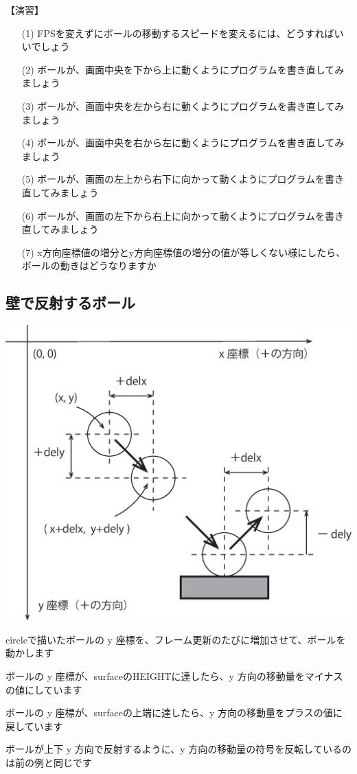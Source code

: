 \documentclass[uplatex,a4paper,11pt,oneside,openany]{jsbook}
\begin{document}
【演習】
\begin{enumerate}
\item[(1)] FPSを変えずにボールの移動するスピードを変えるには、どうすればいいでしょう
\item[(2)] ボールが、画面中央を下から上に動くようにプログラムを書き直してみましょう
\item[(3)] ボールが、画面中央を左から右に動くようにプログラムを書き直してみましょう
\item[(4)] ボールが、画面中央を右から左に動くようにプログラムを書き直してみましょう
\item[(5)] ボールが、画面の左上から右下に向かって動くようにプログラムを書き直してみましょう
\item[(6)] ボールが、画面の左下から右上に向かって動くようにプログラムを書き直してみましょう
\item[(7)] x方向座標値の増分とy方向座標値の増分の値が等しくない様にしたら、ボールの動きはどうなりますか
\end{enumerate}

\subsection{壁で反射するボール}

\begin{center}
\includegraphics[width=0.5\hsize]{figures/eps/pg06.eps}
\end{center}

circleで描いたボールの y 座標を、フレーム更新のたびに増加させて、ボールを動かします

ボールの y 座標が、surfaceのHEIGHTに達したら、y 方向の移動量をマイナスの値にしています

ボールの y 座標が、surfaceの上端に達したら、y 方向の移動量をプラスの値に戻しています



ボールが上下 y 方向で反射するように、y 方向の移動量の符号を反転しているのは前の例と同じです
\end{document}
